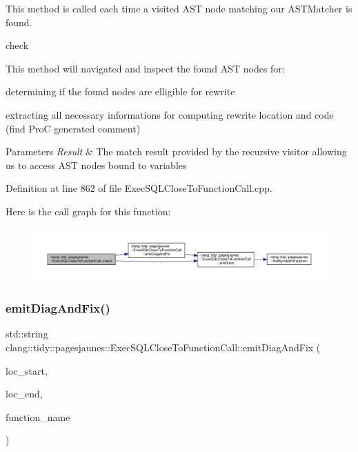 This method is called each time a visited A\+ST node matching our A\+S\+T\+Matcher is found. 

check

This method will navigated and inspect the found A\+ST nodes for\+:
\begin{DoxyItemize}
\item determining if the found nodes are elligible for rewrite
\item extracting all necessary informations for computing rewrite location and code (find ProC generated comment)
\end{DoxyItemize}


\begin{DoxyParams}{Parameters}
{\em Result} & The match result provided by the recursive visitor allowing us to access A\+ST nodes bound to variables \\
\hline
\end{DoxyParams}


Definition at line 862 of file Exec\+S\+Q\+L\+Close\+To\+Function\+Call.\+cpp.

Here is the call graph for this function\+:
\nopagebreak
\begin{figure}[H]
\begin{center}
\leavevmode
\includegraphics[width=350pt]{classclang_1_1tidy_1_1pagesjaunes_1_1_exec_s_q_l_close_to_function_call_a1906033d14542dee9278065f2d7daa6a_cgraph}
\end{center}
\end{figure}
\mbox{\label{classclang_1_1tidy_1_1pagesjaunes_1_1_exec_s_q_l_close_to_function_call_a9a58f75cf980f02ab9f29ac4796e3913}} 
\subsubsection{\texorpdfstring{emit\+Diag\+And\+Fix()}{emitDiagAndFix()}}
{\footnotesize\ttfamily std\+::string clang\+::tidy\+::pagesjaunes\+::\+Exec\+S\+Q\+L\+Close\+To\+Function\+Call\+::emit\+Diag\+And\+Fix (\begin{DoxyParamCaption}\item[{const Source\+Location \&}]{loc\+\_\+start,  }\item[{const Source\+Location \&}]{loc\+\_\+end,  }\item[{const std\+::string \&}]{function\+\_\+name }\end{DoxyParamCaption})}



